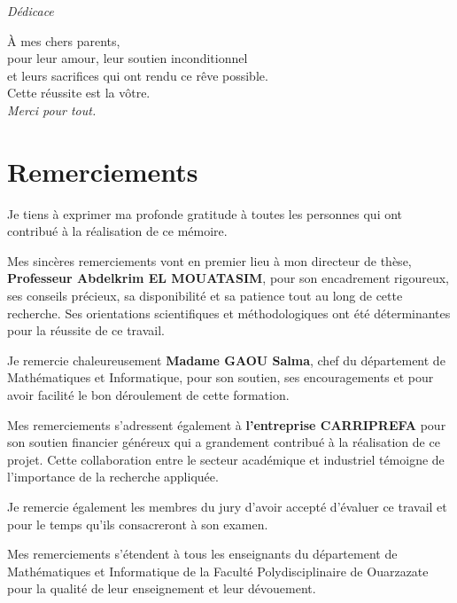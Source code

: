 \documentclass[12pt,a4paper]{report}
\begin{document}
\newpage
\thispagestyle{empty}
\vspace*{5cm}
\begin{center}
    \Large \textit{Dédicace}
\end{center}
\vspace{2cm}
\begin{center}
    \large
    À mes chers parents,\\
    \vspace{0.5cm}
    pour leur amour, leur soutien inconditionnel\\
    et leurs sacrifices qui ont rendu ce rêve possible.\\
    \vspace{1cm}
    Cette réussite est la vôtre.\\
    \vspace{1cm}
    \textit{Merci pour tout.}
\end{center}

\newpage
\chapter*{Remerciements}

Je tiens à exprimer ma profonde gratitude à toutes les personnes qui ont contribué à la réalisation de ce mémoire.

Mes sincères remerciements vont en premier lieu à mon directeur de thèse, \textbf{Professeur Abdelkrim EL MOUATASIM}, pour son encadrement rigoureux, ses conseils précieux, sa disponibilité et sa patience tout au long de cette recherche. Ses orientations scientifiques et méthodologiques ont été déterminantes pour la réussite de ce travail.

Je remercie chaleureusement \textbf{Madame GAOU Salma}, chef du département de Mathématiques et Informatique, pour son soutien, ses encouragements et pour avoir facilité le bon déroulement de cette formation.

Mes remerciements s'adressent également à \textbf{l'entreprise CARRIPREFA} pour son soutien financier généreux qui a grandement contribué à la réalisation de ce projet. Cette collaboration entre le secteur académique et industriel témoigne de l'importance de la recherche appliquée.

Je remercie également les membres du jury d'avoir accepté d'évaluer ce travail et pour le temps qu'ils consacreront à son examen.

Mes remerciements s'étendent à tous les enseignants du département de Mathématiques et Informatique de la Faculté Polydisciplinaire de Ouarzazate pour la qualité de leur enseignement et leur dévouement.
\end{document}
